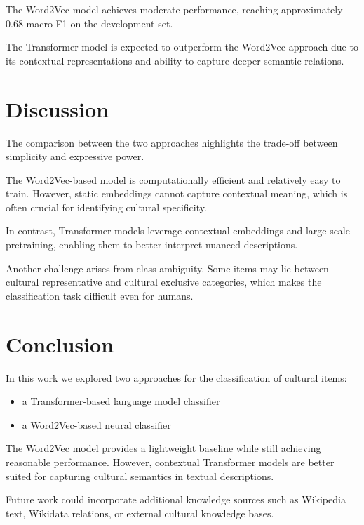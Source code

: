 \documentclass[11pt]{article}
\begin{document}
The Word2Vec model achieves moderate performance, reaching approximately 0.68 macro-F1 on the development set.

The Transformer model is expected to outperform the Word2Vec approach due to its contextual representations and ability to capture deeper semantic relations.

\section{Discussion}

The comparison between the two approaches highlights the trade-off between simplicity and expressive power.

The Word2Vec-based model is computationally efficient and relatively easy to train. However, static embeddings cannot capture contextual meaning, which is often crucial for identifying cultural specificity.

In contrast, Transformer models leverage contextual embeddings and large-scale pretraining, enabling them to better interpret nuanced descriptions.

Another challenge arises from class ambiguity. Some items may lie between cultural representative and cultural exclusive categories, which makes the classification task difficult even for humans.

\section{Conclusion}

In this work we explored two approaches for the classification of cultural items:

\begin{itemize}
\item a Transformer-based language model classifier
\item a Word2Vec-based neural classifier
\end{itemize}

The Word2Vec model provides a lightweight baseline while still achieving reasonable performance. However, contextual Transformer models are better suited for capturing cultural semantics in textual descriptions.

Future work could incorporate additional knowledge sources such as Wikipedia text, Wikidata relations, or external cultural knowledge bases.
\end{document}
